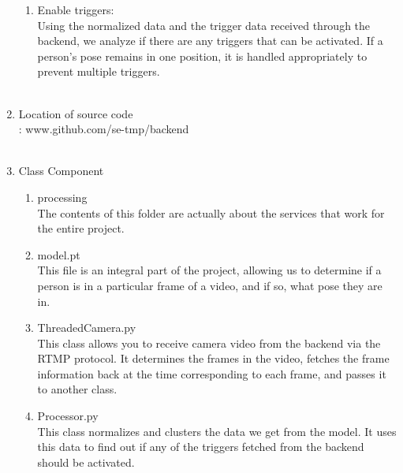 \begin{enumerate}
\begin{enumerate}
                                  \item Enable triggers:\\
                                        Using the normalized data and the trigger data received through the backend, we analyze if there are any triggers that can be activated. If a person's pose remains in one position, it is handled appropriately to prevent multiple triggers.\\\\
                              \end{enumerate}
                        \item Location of source code \\
                              : www.github.com/se-tmp/backend \\\\

                        \item Class Component\\
                              \begin{enumerate}
                                  \item processing\\
                                        The contents of this folder are actually about the services that work for the entire project.\\

                                  \item model.pt\\
                                        This file is an integral part of the project, allowing us to determine if a person is in a particular frame of a video, and if so, what pose they are in.\\

                                  \item ThreadedCamera.py\\
                                        This class allows you to receive camera video from the backend via the RTMP protocol. It determines the frames in the video, fetches the frame information back at the time corresponding to each frame, and passes it to another class.\\

                                  \item Processor.py\\
                                        This class normalizes and clusters the data we get from the model. It uses this data to find out if any of the triggers fetched from the backend should be activated. \\


\end{enumerate}
\end{enumerate}
